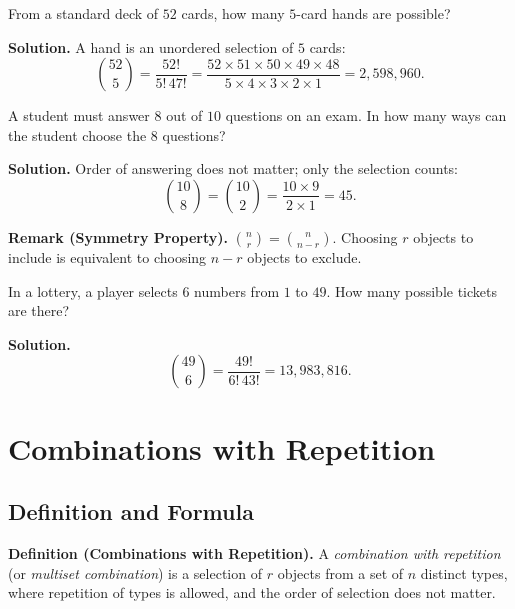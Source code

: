 \documentclass[11pt,a4paper]{article}
\begin{document}
\begin{example}
From a standard deck of $52$ cards, how many $5$-card hands are possible?

\textbf{Solution.} A hand is an unordered selection of $5$ cards:
\begin{equation*}
    \binom{52}{5} = \frac{52!}{5! \, 47!} = \frac{52 \times 51 \times 50 \times 49 \times 48}{5 \times 4 \times 3 \times 2 \times 1} = 2{,}598{,}960.
\end{equation*}
\end{example}

\begin{example}
A student must answer $8$ out of $10$ questions on an exam. In how many ways can the student choose the $8$ questions?

\textbf{Solution.} Order of answering does not matter; only the selection counts:
\begin{equation*}
    \binom{10}{8} = \binom{10}{2} = \frac{10 \times 9}{2 \times 1} = 45.
\end{equation*}
\end{example}

\textbf{Remark (Symmetry Property).} $\displaystyle\binom{n}{r} = \binom{n}{n-r}$. Choosing $r$ objects to include is equivalent to choosing $n-r$ objects to exclude.

\begin{example}
In a lottery, a player selects $6$ numbers from $1$ to $49$. How many possible tickets are there?

\textbf{Solution.}
\begin{equation*}
    \binom{49}{6} = \frac{49!}{6! \, 43!} = 13{,}983{,}816.
\end{equation*}
\end{example}

\section{Combinations with Repetition}

\subsection{Definition and Formula}

\textbf{Definition (Combinations with Repetition).} A \textit{combination with repetition} (or \textit{multiset combination}) is a selection of $r$ objects from a set of $n$ distinct types, where repetition of types is allowed, and the order of selection does not matter.
\end{document}
